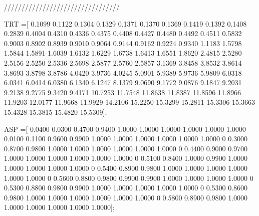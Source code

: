 /////////////////////////////////


TRT =[  0.1099    0.1122    0.1304    0.1329    0.1371    0.1370    0.1369    0.1419    0.1392       0.1408
        0.2839    0.4004    0.4310    0.4336    0.4375    0.4408    0.4427    0.4480    0.4492       0.4511
        0.5832    0.9003    0.8902    0.8939    0.9010    0.9064    0.9144    0.9162    0.9224       0.9340
        1.1183    1.5798    1.5844    1.5891    1.6039    1.6132    1.6229    1.6738    1.6413       1.6551
        1.8620    2.4815    2.5280    2.5156    2.5250    2.5336    2.5698    2.5877    2.5760       2.5857
        3.1369    3.8458    3.8532    3.8614    3.8693    3.8798    3.8786    4.0420    3.9736       4.0245
        5.0901    5.9389    5.9736    5.9809    6.0318    6.0341    6.0414    6.0380    6.1340       6.1247
        8.1379    9.0690    9.1772    9.0876    9.1847    9.2031    9.2138    9.2775    9.3420       9.4171
       10.7253   11.7548   11.8638   11.8387   11.8596   11.8966   11.9203   12.0177   11.9668      11.9929
       14.2106   15.2250   15.3299   15.2811   15.3306   15.3663   15.4328   15.3815   15.4820      15.5309];


ASP =[  0.0400    0.0300    0.4700    0.9400    1.0000    1.0000    1.0000    1.0000    1.0000      1.0000       
        0.0100    0.1100    0.9600    0.9900    1.0000    1.0000    1.0000    1.0000    1.0000      1.0000
             0    0.3000    0.8700    0.9800    1.0000    1.0000    1.0000    1.0000    1.0000      1.0000
             0    0.4400    0.9000    0.9700    1.0000    1.0000    1.0000    1.0000    1.0000      1.0000
             0    0.5100    0.8400    1.0000    0.9900    1.0000    1.0000    1.0000    1.0000      1.0000
             0    0.5400    0.8900    0.9800    1.0000    1.0000    1.0000    1.0000    1.0000      1.0000
             0    0.5600    0.8800    0.9800    0.9900    0.9900    1.0000    1.0000    1.0000      1.0000
             0    0.5300    0.8800    0.9800    0.9900    1.0000    1.0000    1.0000    1.0000      1.0000
             0    0.5300    0.8600    0.9800    1.0000    1.0000    1.0000    1.0000    1.0000      1.0000
             0    0.5800    0.8900    0.9800    1.0000    1.0000    1.0000    1.0000    1.0000      1.0000];
